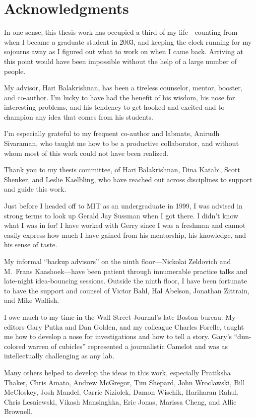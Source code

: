 \chapter*{Acknowledgments}
%

In one sense, this thesis work has occupied a third of my
life---counting from when I became a graduate student in 2003, and
keeping the clock running for my sojourns away as I figured out what
to work on when I came back. Arriving at this point would have been
impossible without the help of a large number of people.

My advisor, Hari Balakrishnan, has been a tireless counselor, mentor,
booster, and co-author. I'm lucky to have had the benefit of his
wisdom, his nose for interesting problems, and his tendency to get
hooked and excited and to champion any idea that comes from his students.

I'm especially grateful to my frequent co-author and labmate, Anirudh
Sivaraman, who taught me how to be a productive collaborator, and
without whom most of this work could not have been realized.

Thank you to my thesis committee, of Hari Balakrishnan, Dina Katabi,
Scott Shenker, and Leslie Kaelbling, who have reached out across
disciplines to support and guide this work.

Just before I headed off to MIT as an undergraduate in 1999, I was
advised in strong terms to look up Gerald Jay Sussman when I got
there. I didn't know what I was in for! I have worked with Gerry since
I was a freshman and cannot easily express how much I have gained from
his mentorship, his knowledge, and his sense of taste.

My informal ``backup advisors'' on the ninth floor---Nickolai
Zeldovich and M.~Frans Kaashoek---have been patient through
innumerable practice talks and late-night idea-bouncing
sessions. Outside the ninth floor, I have been fortunate to have the
support and counsel of Victor Bahl, Hal Abelson, Jonathan Zittrain,
and Mike Walfish.

I owe much to my time in the Wall Street Journal's late Boston
bureau. My editors Gary Putka and Dan Golden, and my colleague Charles
Forelle, taught me how to develop a nose for investigations and how to
tell a story. Gary's ``dun-colored warren of cubicles'' represented a
journalistic Camelot and was as intellectually challenging as any lab.

Many others helped to develop the ideas in this work, especially
Pratiksha Thaker, Chris Amato, Andrew McGregor, Tim Shepard, John
Wroclawski, Bill McCloskey, Josh Mandel, Carrie Niziolek, Damon
Wischik, Hariharan Rahul, Chris Lesniewski, Vikash Mansinghka, Eric
Jonas, Marissa Cheng, and Allie Brownell.

